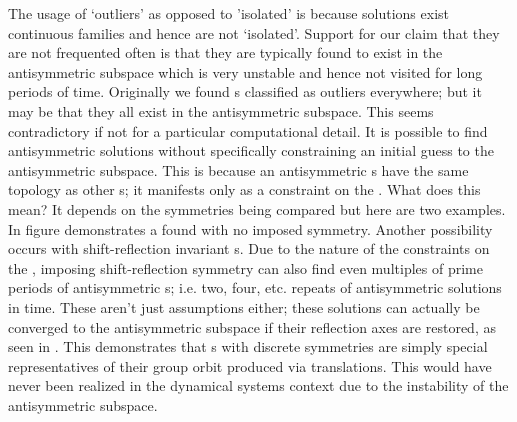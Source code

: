 The usage of `outliers' as opposed to 'isolated' is because solutions exist continuous families
and hence are not `isolated'. Support for our claim that
they are not frequented often is that they are typically found
to exist in the antisymmetric subspace which is very unstable and hence not
visited for long periods of time.  %
Originally we found {\po}s classified as outliers everywhere; but
it may be that they all exist in the antisymmetric subspace. This seems
contradictory if not for a particular computational detail.
It is possible to find antisymmetric solutions
without specifically constraining an initial guess to the antisymmetric subspace.
This is because an antisymmetric {\po}s have the same topology as other {\po}s;
it manifests only as a constraint on the {\Fcs}.
What does this mean? It depends
on the symmetries being compared but here are two examples. In figure %
demonstrates a {\po} found with no imposed symmetry.
Another possibility occurs with shift-reflection invariant {\po}s. Due to
the nature of the constraints on the {\Fcs}, imposing shift-reflection symmetry
can also find even multiples of prime periods of antisymmetric {\po}s;
i.e. two, four, etc. repeats of antisymmetric solutions in time.
These aren't just assumptions either; these solutions can actually be converged to the
antisymmetric subspace if their reflection axes are restored, as seen in {}.
This demonstrates that {\po}s with discrete symmetries are simply special representatives
of their group orbit produced via translations.
This would have never been realized in the dynamical
systems context due to the instability of the antisymmetric subspace.%

